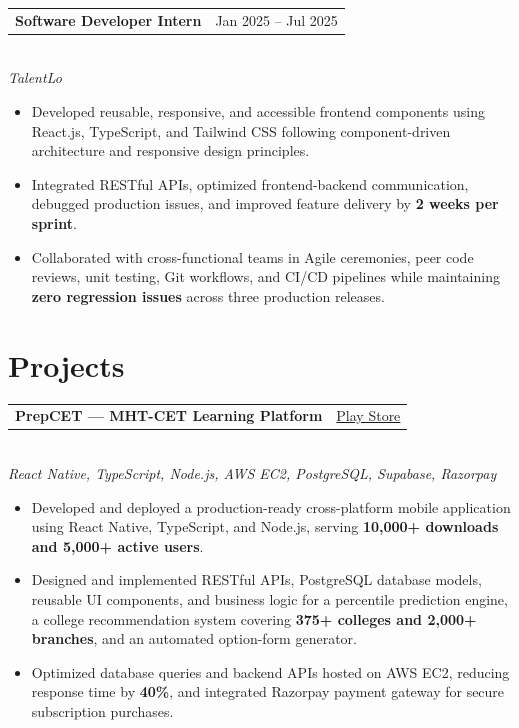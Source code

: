 \documentclass[9pt]{extarticle}
\makeatletter
\newcommand{\entryheader}[2]{%
  \noindent\begin{tabularx}{\linewidth}{@{}X r@{}}
    \textbf{#1} & #2
  \end{tabularx}%
}
\makeatother
\begin{document}
\entryheader{Software Developer Intern}{Jan 2025 -- Jul 2025}\\
\textit{\small TalentLo}
\begin{itemize}
  \item Developed reusable, responsive, and accessible frontend components using React.js, TypeScript, and Tailwind CSS following component-driven architecture and responsive design principles.
  \item Integrated RESTful APIs, optimized frontend-backend communication, debugged production issues, and improved feature delivery by \textbf{2 weeks per sprint}.
  \item Collaborated with cross-functional teams in Agile ceremonies, peer code reviews, unit testing, Git workflows, and CI/CD pipelines while maintaining \textbf{zero regression issues} across three production releases.
\end{itemize}

\section*{Projects}

\entryheader{PrepCET --- MHT-CET Learning Platform}{\href{https://play.google.com/store/apps/details?id=com.anonymous.PrepCET}{Play Store}}\\
\textit{\small React Native, TypeScript, Node.js, AWS EC2, PostgreSQL, Supabase, Razorpay} 
\begin{itemize}
  \item Developed and deployed a production-ready cross-platform mobile application using React Native, TypeScript, and Node.js, serving \textbf{10,000+ downloads and 5,000+ active users}.
  \item Designed and implemented RESTful APIs, PostgreSQL database models, reusable UI components, and business logic for a percentile prediction engine, a college recommendation system covering \textbf{375+ colleges and 2,000+ branches}, and an automated option-form generator.
  \item Optimized database queries and backend APIs hosted on AWS EC2, reducing response time by \textbf{40\%}, and integrated Razorpay payment gateway for secure subscription purchases.
\end{itemize}
\end{document}
